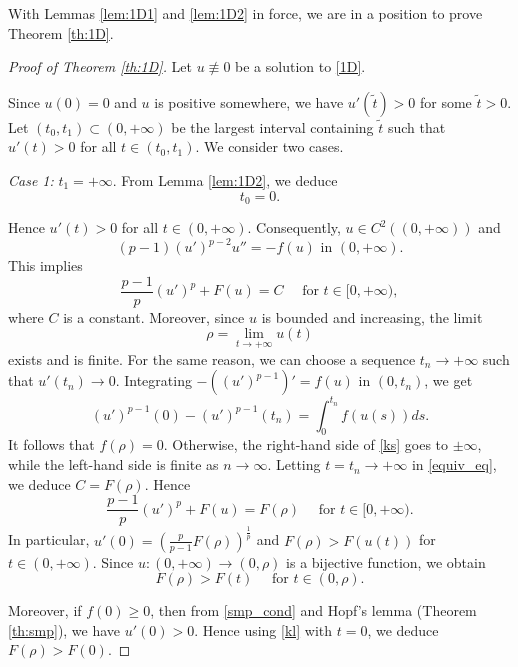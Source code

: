 \documentclass[reqno]{amsart}
\theoremstyle{plain}
\theoremstyle{definition}
\theoremstyle{remark}
\begin{document}
	With Lemmas \ref{lem:1D1} and \ref{lem:1D2} in force, we are in a position to prove Theorem \ref{th:1D}.
	\begin{proof}[Proof of Theorem \ref{th:1D}]
		Let $u\not\equiv 0$ be a solution to \eqref{1D}.
		
		Since $u(0)=0$ and $u$ is positive somewhere, we have $u'(\tilde t)>0$ for some $\tilde t>0$. Let $(t_0, t_1)\subset(0,+\infty)$ be the largest interval containing $\tilde t$ such that $u'(t) > 0$ for all $t\in(t_0, t_1)$. We consider two cases.
		
		\textit{Case 1:} $t_1=+\infty$. From Lemma \ref{lem:1D2}, we deduce
		\[
		t_0=0.
		\]
		
		Hence $u'(t) > 0$ for all $t\in(0,+\infty)$. Consequently, $u \in C^2((0,+\infty))$ and
		\[
		(p-1)(u')^{p-2}u'' = -f(u) \text{ in } (0,+\infty).
		\]
		This implies
		\begin{equation}\label{equiv_eq}
			\frac{p-1}{p} (u')^p + F(u) = C \quad\text{ for } t\in[0,+\infty),
		\end{equation}
		where $C$ is a constant. Moreover, since $u$ is bounded and increasing, the limit
		\[
		\rho = \lim_{t\to+\infty} u(t)
		\]
		exists and is finite. For the same reason, we can choose a sequence $t_n\to+\infty$ such that $u'(t_n)\to0$. Integrating $-((u')^{p-1})' = f(u)$ in $(0,t_n)$, we get
		\begin{equation}\label{ks}
			(u')^{p-1}(0) - (u')^{p-1}(t_n) = \int_{0}^{t_n} f(u(s)) ds.
		\end{equation}
		It follows that $f(\rho)=0$. Otherwise, the right-hand side of \eqref{ks} goes to $\pm\infty$, while the left-hand side is finite as $n\to\infty$.
		Letting $t=t_n\to+\infty$ in \eqref{equiv_eq}, we deduce $C=F(\rho)$. Hence
		\begin{equation}\label{kl}
			\frac{p-1}{p} (u')^p + F(u) = F(\rho) \quad\text{ for } t\in[0,+\infty).
		\end{equation}
		In particular, $u'(0)=\left(\frac{p}{p-1}F(\rho)\right)^\frac{1}{p}$ and $F(\rho)>F(u(t))$ for $t\in(0,+\infty)$. Since $u:(0,+\infty)\to(0,\rho)$ is a bijective function, we obtain
		\[
		F(\rho)>F(t) \quad\text{ for } t\in(0,\rho).
		\]
		
		Moreover, if $f(0)\ge0$, then from \eqref{smp_cond} and Hopf's lemma (Theorem \ref{th:smp}), we have $u'(0)>0$. Hence using \eqref{kl} with $t=0$, we deduce $F(\rho)>F(0)$.
		

\end{proof}
\end{document}
